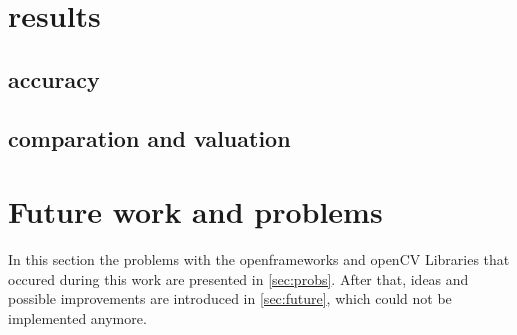\documentclass[journal,final,a4paper,twoside]{PS}
\begin{document}
\section{results}
\label{sec:results}
\subsection{accuracy}
\subsection{comparation and valuation}

\section{Future work and problems}
\label{sec:work_probs}
In this section the problems with the openframeworks and openCV Libraries that occured during this work are presented in \ref{sec:probs}. After that, ideas and possible improvements are introduced in \ref{sec:future}, which could not be implemented anymore.
\end{document}
